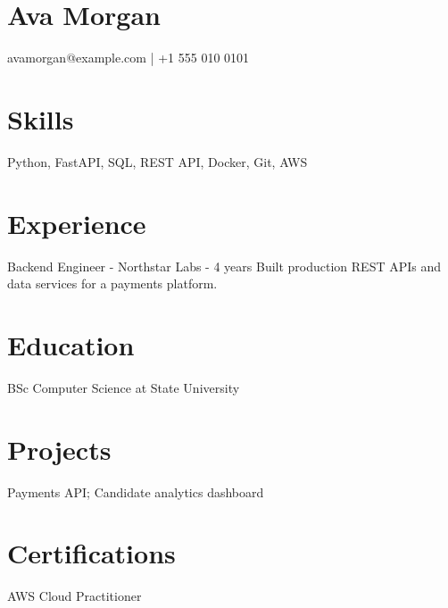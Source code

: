 \section*{Ava Morgan}
avamorgan@example.com | +1 555 010 0101
\section*{Skills}
Python, FastAPI, SQL, REST API, Docker, Git, AWS
\section*{Experience}
Backend Engineer - Northstar Labs - 4 years
Built production REST APIs and data services for a payments platform.
\section*{Education}
BSc Computer Science at State University
\section*{Projects}
Payments API; Candidate analytics dashboard
\section*{Certifications}
AWS Cloud Practitioner
